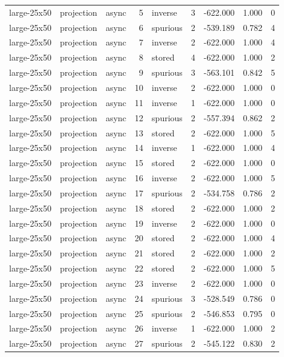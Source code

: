 \begin{tabular}{lllrlrrrr}
large-25x50 & projection & async & 5 & inverse & 3 & -622.000 & 1.000 & 0 \\
large-25x50 & projection & async & 6 & spurious & 2 & -539.189 & 0.782 & 4 \\
large-25x50 & projection & async & 7 & inverse & 2 & -622.000 & 1.000 & 4 \\
large-25x50 & projection & async & 8 & stored & 4 & -622.000 & 1.000 & 2 \\
large-25x50 & projection & async & 9 & spurious & 3 & -563.101 & 0.842 & 5 \\
large-25x50 & projection & async & 10 & inverse & 2 & -622.000 & 1.000 & 0 \\
large-25x50 & projection & async & 11 & inverse & 1 & -622.000 & 1.000 & 0 \\
large-25x50 & projection & async & 12 & spurious & 2 & -557.394 & 0.862 & 2 \\
large-25x50 & projection & async & 13 & stored & 2 & -622.000 & 1.000 & 5 \\
large-25x50 & projection & async & 14 & inverse & 1 & -622.000 & 1.000 & 4 \\
large-25x50 & projection & async & 15 & stored & 2 & -622.000 & 1.000 & 0 \\
large-25x50 & projection & async & 16 & inverse & 2 & -622.000 & 1.000 & 5 \\
large-25x50 & projection & async & 17 & spurious & 2 & -534.758 & 0.786 & 2 \\
large-25x50 & projection & async & 18 & stored & 2 & -622.000 & 1.000 & 2 \\
large-25x50 & projection & async & 19 & inverse & 2 & -622.000 & 1.000 & 0 \\
large-25x50 & projection & async & 20 & stored & 2 & -622.000 & 1.000 & 4 \\
large-25x50 & projection & async & 21 & stored & 2 & -622.000 & 1.000 & 2 \\
large-25x50 & projection & async & 22 & stored & 2 & -622.000 & 1.000 & 5 \\
large-25x50 & projection & async & 23 & inverse & 2 & -622.000 & 1.000 & 0 \\
large-25x50 & projection & async & 24 & spurious & 3 & -528.549 & 0.786 & 0 \\
large-25x50 & projection & async & 25 & spurious & 2 & -546.853 & 0.795 & 0 \\
large-25x50 & projection & async & 26 & inverse & 1 & -622.000 & 1.000 & 2 \\
large-25x50 & projection & async & 27 & spurious & 2 & -545.122 & 0.830 & 2 \\

\end{tabular}
